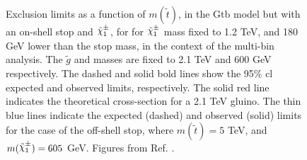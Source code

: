 \begin{figure}
  \centering
  \caption{Exclusion limits as a function of $m(\tilde{t})$, in the Gtb model but with an on-shell stop and $\chinoonepm$, 
  for   
  for $\chinoonepm$ mass fixed to 1.2 TeV, and   180 GeV lower than the stop mass,
  in the context of the multi-bin analysis. The $\tilde{g}$ and \ninoone masses are fixed to 2.1 TeV and 600 GeV respectively.   
  The dashed and solid bold lines  show the 95\% \gls{cl} expected and observed limits, respectively.    
  The solid red line indicates the theoretical cross-section for a 2.1 TeV gluino. 
  The thin blue lines indicate the expected (dashed) and observed (solid) limits for the case of the off-shell stop, where $m(\tilde{t}) = 5$ TeV, and $m(\chinoonepm) = 605$ GeV.
  Figures from Ref. \cite{ATLAS-CONF-2018-041}.}
  \label{fig:limits_GtbOnshell}
\end{figure}
